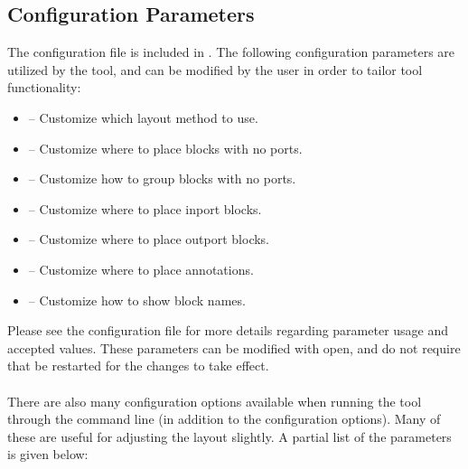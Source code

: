 \documentclass{article}
\newcommand{\toolFolder}{\cmd{AutoLayout}}
\begin{document}
\subsection{Configuration Parameters}
\label{SEC:config}
The configuration file  is included in \cmd{\toolFolder\textbackslash src}. The following configuration parameters are utilized by the tool, and can be modified by the user in order to tailor tool functionality:

\begin{itemize}
	\item \label{item:layout-type}  -- Customize which layout method to use.
	\item {} -- Customize where to place blocks with no ports.
	\item {} -- Customize how to group blocks with no ports.
	\item {} -- Customize where to place inport blocks.
	\item {} -- Customize where to place outport blocks.
	\item {} -- Customize where to place annotations.
	\item {} -- Customize how to show block names. 
\end{itemize}

Please see the configuration file for more details regarding parameter usage and accepted values. These parameters can be modified with \Matlab open, and do not require that \Matlab be restarted for the changes to take effect.
\\\\
There are also many configuration options available when running the tool through the command line (in addition to the configuration options). Many of these are useful for adjusting the layout slightly. A partial list of the parameters is given below:
\end{document}
